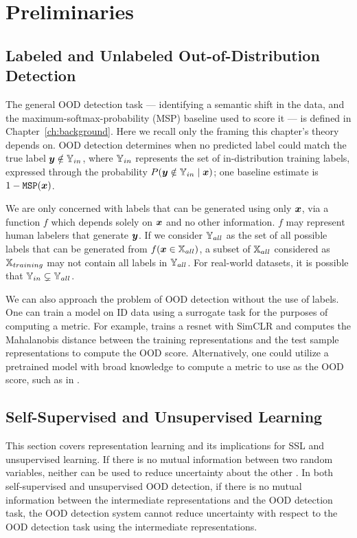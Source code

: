 \section{Preliminaries}
\label{sec:lb-preliminaries}

\subsection{Labeled and Unlabeled Out-of-Distribution Detection}

The general OOD detection task --- identifying a semantic shift in the data, and the maximum-softmax-probability (MSP) baseline used to score it --- is defined in Chapter~\ref{ch:background}. Here we recall only the framing this chapter's theory depends on. OOD detection determines when no predicted label could match the true label ${\bm{y}} \notin {\mathbb{Y}}_{in}$, where ${\mathbb{Y}}_{in}$ represents the set of in-distribution training labels, expressed through the probability $P({\bm{y}} \notin {\mathbb{Y}}_{in} \mid {\bm{x}})$; one baseline estimate is $1 - \texttt{MSP}({\bm{x}})$.

We are only concerned with labels that can be generated using only ${\bm{x}}$, via a function $f$ which depends solely on ${\bm{x}}$ and no other information. $f$ may represent human labelers that generate ${\bm{y}}$. If we consider ${\mathbb{Y}}_{all}$ as the set of all possible labels that can be generated from $f({\bm{x}} \in {\mathbb{X}}_{all})$, a subset of ${\mathbb{X}}_{all}$ considered as ${\mathbb{X}}_{training}$ may not contain all labels in ${\mathbb{Y}}_{all}$. For real-world datasets, it is possible that ${\mathbb{Y}}_{in} \subsetneq {\mathbb{Y}}_{all}$.

We can also approach the problem of OOD detection without the use of labels. One can train a model on ID data using a surrogate task for the purposes of computing a metric. For example, \citet{sehwag2021ssd} trains a resnet with SimCLR and computes the Mahalanobis distance between the training representations and the test sample representations to compute the OOD score. Alternatively, one could utilize a pretrained model with broad knowledge to compute a metric to use as the OOD score, such as in \citet{wang2023clipn}.

\subsection{Self-Supervised and Unsupervised Learning}

This section covers representation learning and its implications for SSL and unsupervised learning. If there is no mutual information between two random variables, neither can be used to reduce uncertainty about the other \citep{shannon1948mathematical}. In both self-supervised and unsupervised OOD detection, if there is no mutual information between the intermediate representations and the OOD detection task, the OOD detection system cannot reduce uncertainty with respect to the OOD detection task using the intermediate representations.

